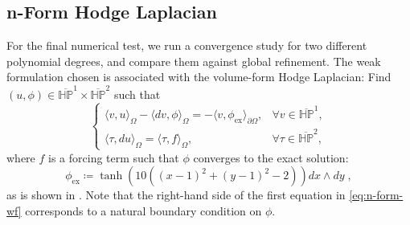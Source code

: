 \documentclass[10pt]{article}
\newcommand{\vSpace}[1]{\mathbb{#1}}
\newcommand{\polar}{P}
\newcommand{\hSpace}[1]{\mathit{\vSpace{H}\vSpace{#1}}}
\theoremstyle{plain}
\theoremstyle{definition}
\theoremstyle{remark}
\begin{document}
\subsection{n-Form Hodge Laplacian}
\label{subsec:n-form-hl}

For the final numerical test, we run a convergence study for two different polynomial
degrees, and compare them against global refinement. The weak formulation chosen is
associated with the volume-form Hodge Laplacian:
Find \((u, \phi) \in \overline{\hSpace{\polar}}^1 \times \overline{\hSpace{\polar}}^2\) such
that 
\begin{equation}
    \label{eq:n-form-wf}
    \begin{cases}
        \langle v, u \rangle_{\Omega} - \langle dv , \phi \rangle_{\Omega} =
        - \langle v, \phi_{\text{ex}} \rangle_{\partial \Omega}, & \forall v \in
    \overline{\hSpace{\polar}}^1,
    \\
        \langle \tau, du \rangle_{\Omega} =  \langle \tau, f \rangle_{\Omega}, & \forall \tau
    \in \overline{\hSpace{\polar}}^2,
    \end{cases}
\end{equation}
where \(f\) is a forcing term such that \(\phi\) converges to the exact solution:
\begin{equation*}
    \phi_{\text{ex}} \coloneqq \tanh\left(10((x-1)^2 + (y-1)^2 - 2)\right)dx\wedge dy\;,    
\end{equation*}
as is shown in .
Note that the right-hand side of the first equation in \eqref{eq:n-form-wf} corresponds to a
natural boundary condition on \(\phi\).
\end{document}
